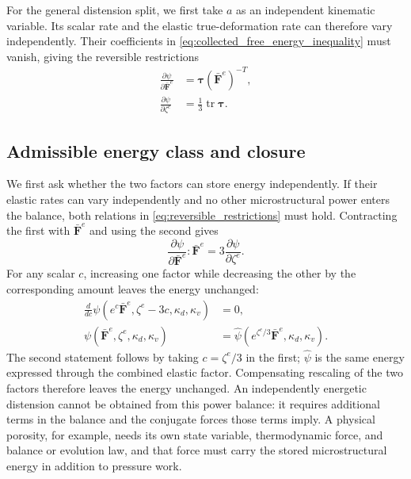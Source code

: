 \documentclass[11pt]{article}
\newcommand{\mbf}[1]{\mathbf{#1}}
\newcommand{\bs}[1]{\boldsymbol{#1}}
\newcommand{\tr}{\operatorname{tr}}
\begin{document}
For the general distension split, we first take \(a\) as an independent
kinematic variable.  Its scalar rate and the elastic true-deformation rate can
therefore vary independently. Their coefficients
in \eqref{eq:collected_free_energy_inequality} must vanish, giving the
reversible restrictions
\begin{subequations}
	\label{eq:reversible_restrictions}
	\begin{align}
		\frac{\partial\psi}{\partial\bar{\mbf F}^{e}}
		 & =\bs\tau(\bar{\mbf F}^{e})^{-T},
		\label{eq:true_stress_restriction}  \\
		\frac{\partial\psi}{\partial\zeta^e}
		 & =\frac{1}{3}\tr\bs\tau.
		\label{eq:distension_stress_restriction}
	\end{align}
\end{subequations}
\subsection{Admissible energy class and closure}
\label{sec:energy_class}

We first ask whether the two factors can store energy independently. If their
elastic rates can vary independently and no other microstructural power enters
the balance, both relations in \eqref{eq:reversible_restrictions} must hold.
Contracting the first with \(\bar{\mbf F}^e\) and using the second gives
\begin{equation}
 \frac{\partial\psi}{\partial\bar{\mbf F}^e}:\bar{\mbf F}^e
 =3\frac{\partial\psi}{\partial\zeta^e}.
 \label{eq:energy_scaling_identity}
\end{equation}
For any scalar \(c\), increasing one factor while decreasing the other by
the corresponding amount leaves the energy unchanged:
\begin{align}
 \frac{d}{dc}\psi\left(e^c\bar{\mbf F}^e,\zeta^e-3c,\kappa_d,\kappa_v\right)
 &=0, \label{eq:energy_scaling_invariance}\\
 \psi\left(\bar{\mbf F}^e,\zeta^e,\kappa_d,\kappa_v\right)
 &=\widehat\psi\left(e^{\zeta^e/3}\bar{\mbf F}^e,\kappa_d,\kappa_v\right).
 \label{eq:energy_class}
\end{align}
The second statement follows by taking \(c=\zeta^e/3\) in the first;
\(\widehat\psi\) is the same energy expressed through the combined elastic
factor. Compensating rescaling of the two factors therefore leaves the energy
unchanged. An independently energetic distension cannot be obtained from this
power balance: it requires additional terms in the balance and the conjugate
forces those terms imply. A physical porosity, for example, needs its own state
variable, thermodynamic force, and balance or evolution law, and that force
must carry the stored microstructural energy in addition to pressure work.
\end{document}

